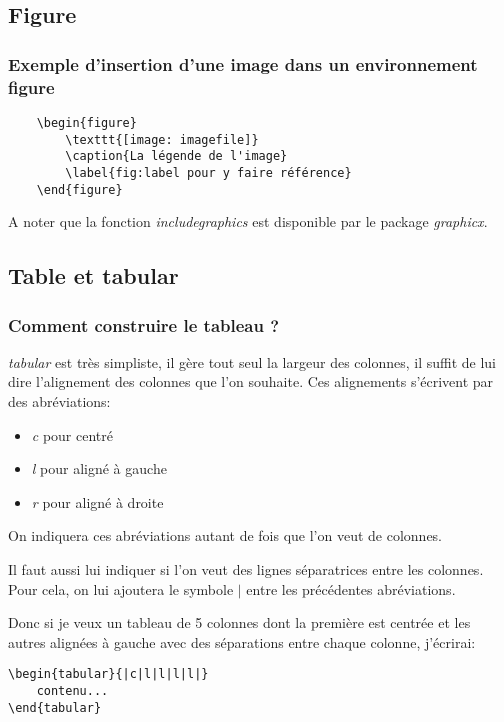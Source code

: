 \documentclass{beamer}
\begin{document}
\subsection{Figure}
\begin{frame}[fragile]
	\frametitle{Exemple d'insertion d'une image dans un environnement figure}
	\begin{Verbatim}
	\begin{figure}
		\texttt{[image: imagefile]}
		\caption{La légende de l'image}
		\label{fig:label pour y faire référence}
	\end{figure}
	\end{Verbatim}
	\vspace{.2cm}
	A noter que la fonction \textit{includegraphics} est disponible par le package \textit{graphicx}.
\end{frame}

\subsection{Table et tabular}
\begin{frame}[fragile]
	\frametitle{Comment construire le tableau ?}
	\textit{tabular} est très simpliste, il gère tout seul la largeur des colonnes, il suffit de lui dire l'alignement des colonnes que l'on souhaite. Ces alignements s'écrivent par des abréviations:
	\begin{itemize}
		\item \textit{c} pour centré
		\item \textit{l} pour aligné à gauche
		\item \textit{r} pour aligné à droite
	\end{itemize}
	On indiquera ces abréviations autant de fois que l'on veut de colonnes.

	Il faut aussi lui indiquer si l'on veut des lignes séparatrices entre les colonnes. Pour cela, on lui ajoutera le symbole $\mid$ entre les précédentes abréviations.
\end{frame}

\begin{frame}[fragile]
	Donc si je veux un tableau de 5 colonnes dont la première est centrée et les autres alignées à gauche avec des séparations entre chaque colonne, j'écrirai:
\begin{Verbatim}
\begin{tabular}{|c|l|l|l|l|}
	contenu...
\end{tabular}
\end{Verbatim}
\end{frame}
\end{document}

